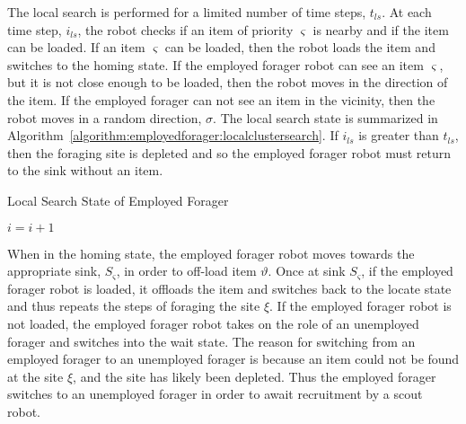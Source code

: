 The local search is performed for a limited number of time steps, $t_{ls}$. At each time step, $i_{ls}$, the robot checks if an item of priority $\varsigma$ is nearby and if the item can be loaded. If an item $\varsigma$ can be loaded, then the robot loads the item and switches to the homing state. If the employed forager robot can see an item $\varsigma$, but it is not close enough to be loaded, then the robot moves in the direction of the item. If the employed forager can not see an item in the vicinity, then the robot moves in a random direction, $\sigma$. The local search state is summarized in Algorithm~\ref{algorithm:employedforager:localclustersearch}. If $i_{ls}$ is greater than $t_{ls}$, then the foraging site is depleted and so the employed forager robot must return to the sink without an item.

\begin{algorithm}
\caption{Local Search State of Employed Forager}
\label{algorithm:employedforager:localclustersearch}
\begin{algorithmic}[1]
			\State {}
			\State {}
			\State {}
		\Else
			\State {}
			\State {}	
		\EndIf
\Else
\EndIf
\State $i =i + 1$
\EndFunction
\end{algorithmic}
\end{algorithm}

When in the homing state, the employed forager robot moves towards the appropriate sink, $S_\varsigma$, in order to off-load item $\vartheta$. Once at sink $S_\varsigma$, if the employed forager robot is loaded, it offloads the item and switches back to the locate state and thus repeats the steps of foraging the site $\xi$. If the employed forager robot is not loaded, the employed forager robot takes on the role of an unemployed forager and switches into the wait state. The reason for switching from an employed forager to an unemployed forager is because an item could not be found at the site $\xi$, and the site has likely been depleted. Thus the employed forager switches to an unemployed forager in order to await recruitment by a scout robot.

